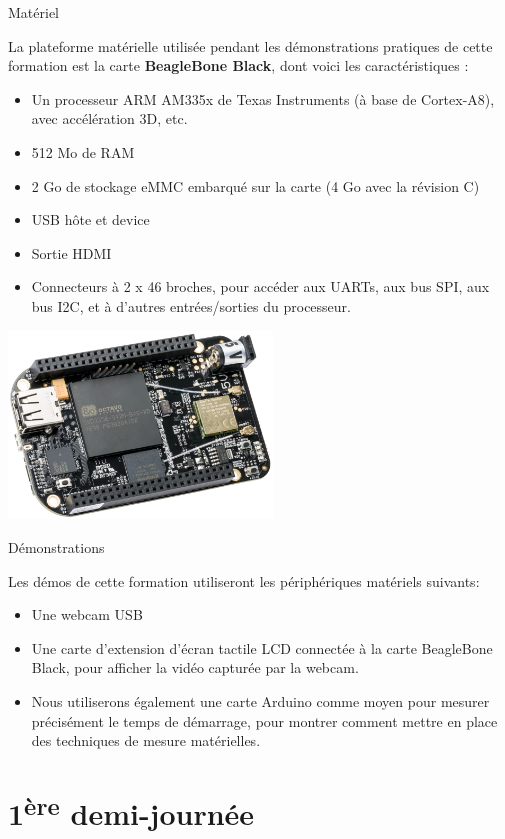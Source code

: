 \documentclass[a4paper,12pt,obeyspaces,spaces,hyphens]{article}
\begin{document}
\feagendatwocolumn
{Matériel}
{
  La plateforme matérielle utilisée pendant les démonstrations pratiques de
  cette formation est la carte {\bf BeagleBone Black}, dont voici les
  caractéristiques :

  \begin{itemize}
  \item Un processeur ARM AM335x de Texas Instruments (à base de
    Cortex-A8), avec accélération 3D, etc.
  \item 512 Mo de RAM
  \item 2 Go de stockage eMMC embarqué sur la carte
	\newline(4 Go avec la révision C)
  \item USB hôte et device
  \item Sortie HDMI
  \item Connecteurs à 2 x 46 broches, pour accéder aux UARTs, aux
        bus SPI, aux bus I2C, et à d'autres entrées/sorties du
        processeur.
  \end{itemize}
}
{}
{
  \begin{center}
    \includegraphics[height=5cm]{../slides/beagleboneblack-board/beagleboneblack.png}
  \end{center}
}

\feagendaonecolumn
{Démonstrations}
{
  Les démos de cette formation utiliseront les périphériques matériels suivants:

  \begin{itemize}
  \item Une webcam USB
  \item Une carte d'extension d'écran tactile LCD connectée à la carte
    BeagleBone Black, pour afficher la vidéo capturée par la webcam.
  \item Nous utiliserons également une carte Arduino comme moyen pour mesurer
    précisément le temps de démarrage, pour montrer comment mettre en place
    des techniques de mesure matérielles.
  \end{itemize}
}

\section{1\textsuperscript{ère} demi-journée}
\end{document}
